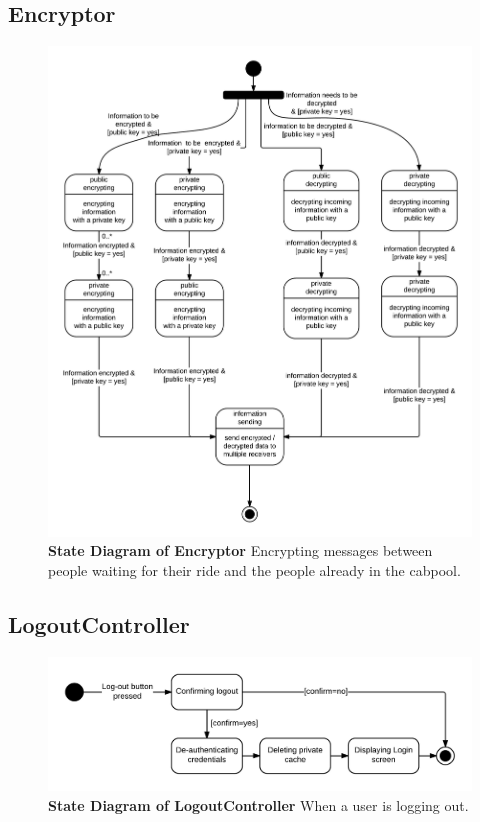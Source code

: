 \documentclass[]{article}
\begin{document}
\subsection{Encryptor}
\begin{figure}[H]
\label{encrypt}
	\centering
	\includegraphics[width=1\textwidth]{Encryptor.png}
	\caption{\textbf{State Diagram of Encryptor} Encrypting messages between people waiting for their ride and the people already in the cabpool.}
\end{figure}

\subsection{LogoutController}
\begin{figure}[H]
\label{LCState}
	\centering
	\includegraphics[width=1\textwidth]{LogoutController.png}
	\caption{\textbf{State Diagram of LogoutController} When a user is logging out.}
\end{figure}
\end{document}
